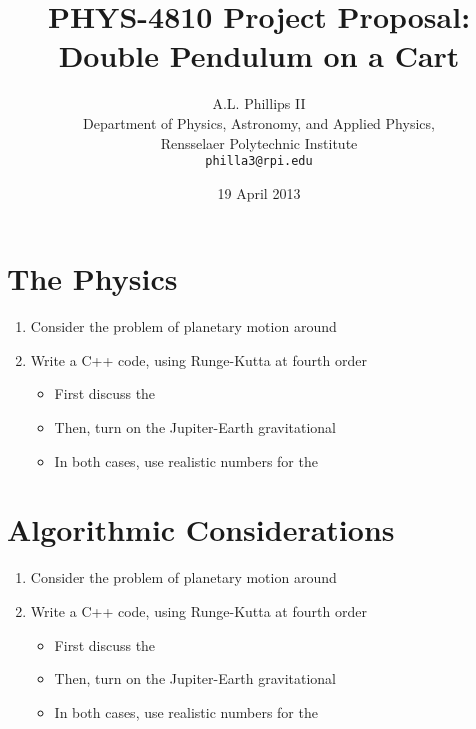 \documentclass{report}
\begin{document}
\title{\textbf{PHYS-4810 Project Proposal:} 
\\Double Pendulum on a Cart}
\author{A.L. Phillips II\\
  Department of Physics, Astronomy, and Applied Physics,\\
  Rensselaer Polytechnic Institute\\
  \texttt{philla3@rpi.edu}}
 \date{19 April 2013}
 \renewcommand{\chaptername}{Assignment}
 \setcounter {chapter}{2}
\maketitle
\section*{The Physics}

\begin{enumerate}

\item Consider the problem of planetary motion around 

\item Write a \textsc{C++} code, using Runge-Kutta at fourth order 

	\begin{itemize}

\item First discuss the

\item Then, turn on the Jupiter-Earth gravitational

\item In both cases, use realistic numbers for the 

\end{itemize}

\end{enumerate}




\section*{Algorithmic Considerations}

\begin{enumerate}

\item Consider the problem of planetary motion around 

\item Write a \textsc{C++} code, using Runge-Kutta at fourth order 

	\begin{itemize}

\item First discuss the

\item Then, turn on the Jupiter-Earth gravitational

\item In both cases, use realistic numbers for the 

\end{itemize}

\end{enumerate}
\end{document}
